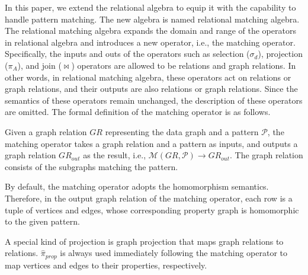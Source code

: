 In this paper, we extend the relational algebra to equip it with the capability to handle pattern matching.
The new algebra is named relational matching algebra.
The relational matching algebra expands the domain and range of the operators in relational algebra and introduces a new operator, i.e., the matching operator.
Specifically, the inputs and outs of the operators such as selection ($\sigma_d$), projection ($\pi_A$), and join ($\Join$) operators are allowed to be relations and graph relations.
In other words, in relational matching algebra, these operators act on relations or graph relations, and their outputs are also relations or graph relations.
Since the semantics of these operators remain unchanged, the description of these operators are omitted.
The formal definition of the matching operator is as follows.

\begin{definition}
    Given a graph relation $GR$ representing the data graph and a pattern $\mathcal{P}$, the matching operator takes a graph relation and a pattern as inputs, and outputs a graph relation $GR_{out}$ as the result, i.e., $\mathcal{M}(GR, \mathcal{P}) \rightarrow GR_{out}$.
    The graph relation consists of the subgraphs matching the pattern.
\end{definition}

By default, the matching operator adopts the homomorphism semantics.
Therefore, in the output graph relation of the matching operator, each row is a tuple of vertices and edges, whose corresponding property graph is homomorphic to the given pattern.

A special kind of projection is graph projection that maps graph relations to relations.
$\widehat{\pi}_{prop}$ is always used immediately following the matching operator to map vertices and edges to their properties, respectively.

